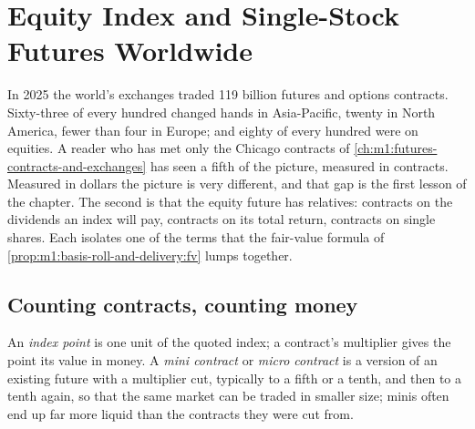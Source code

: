 \chapter{Equity Index and Single-Stock Futures Worldwide}\label{ch:m1:index-and-single-stock-futures-worldwide}

In 2025 the world's exchanges traded 119 billion futures and options
contracts. Sixty-three of every hundred changed hands in Asia-Pacific,
twenty in North America, fewer than four in Europe; and eighty of every
hundred were on equities. A reader who has met only the Chicago contracts of
\cref{ch:m1:futures-contracts-and-exchanges} has seen a fifth of the
picture, measured in contracts. Measured in dollars the picture is very
different, and that gap is the first lesson of the chapter. The second is
that the equity future has relatives: contracts on the dividends an index
will pay, contracts on its total return, contracts on single shares. Each
isolates one of the terms that the fair-value formula of
\cref{prop:m1:basis-roll-and-delivery:fv} lumps together.

\section{Counting contracts, counting money}

\begin{definition}\label{def:m1:index-and-single-stock-futures-worldwide:point}
An \emph{index point} is one unit of the quoted index; a
contract's multiplier gives the point its value in money. A \emph{mini
contract} or \emph{micro contract}
is a version of an existing future with a multiplier cut, typically to a
fifth or a tenth, and then to a tenth again, so that the same market can be
traded in smaller size; minis often end up far more liquid than the
contracts they were cut from.
\end{definition}

